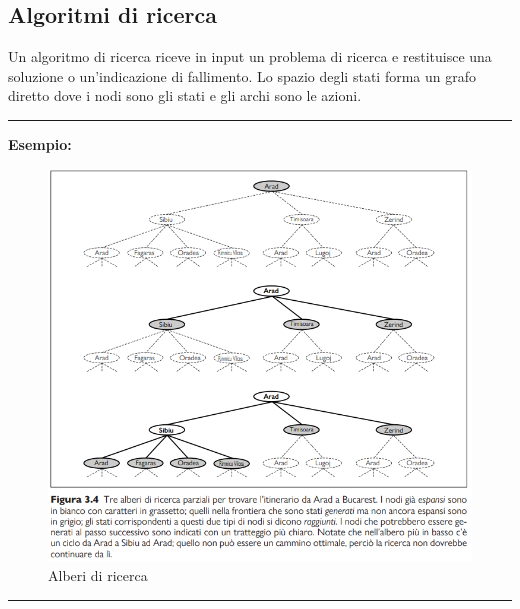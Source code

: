 \documentclass{article}
\begin{document}
\subsection{Algoritmi di ricerca}
Un algoritmo di ricerca riceve in input un problema di ricerca e restituisce una soluzione o un'indicazione di fallimento. 
Lo spazio degli stati forma un grafo diretto dove i nodi sono gli stati e gli archi sono  le azioni.
\par\noindent\rule{\textwidth}{0.4pt}
\textbf{Esempio:}
\begin{figure}[H]
    \centering
    \includegraphics[width=0.5\linewidth]{Images/AlberiDiRicerca.png}
    \caption{Alberi di ricerca}
    \label{fig:enter-label}
\end{figure}
\par\noindent\rule{\textwidth}{0.4pt}
\newpage
\end{document}
